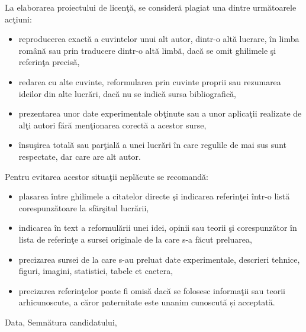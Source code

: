         La elaborarea proiectului de licenţă, se consideră plagiat una dintre următoarele acţiuni: 
        \begin{itemize}
            \setlength\itemsep{-0.5em}
            \item reproducerea exactă a cuvintelor unui alt autor, dintr-o altă lucrare, în limba română sau prin traducere dintr-o altă limbă, dacă se omit ghilimele şi referinţa precisă, 
            \item redarea cu alte cuvinte, reformularea prin cuvinte proprii sau rezumarea ideilor din alte lucrări, dacă nu se indică sursa bibliografică, 
            \item prezentarea unor date experimentale obţinute sau a unor aplicaţii realizate de alţi autori fără menţionarea corectă a acestor surse, 
            \item însuşirea totală sau parţială a unei lucrări în care regulile de mai sus sunt respectate, dar care are alt autor. 
        \end{itemize}
        Pentru evitarea acestor situaţii neplăcute se recomandă:
        \begin{itemize}
            \setlength\itemsep{-0.5em}
            \item plasarea între ghilimele a citatelor directe şi indicarea referinţei într-o listă corespunzătoare la sfărşitul lucrării, 
            \item indicarea în text a reformulării unei idei, opinii sau teorii şi corespunzător în lista de referinţe a sursei originale de la care s-a făcut preluarea, 
            \item precizarea sursei de la care s-au preluat date experimentale, descrieri tehnice, figuri, imagini, statistici, tabele et caetera, 
            \item precizarea referinţelor poate fi omisă dacă se folosesc informaţii sau teorii arhicunoscute, a căror paternitate este unanim cunoscută și acceptată.
        \end{itemize}
        Data,  \hfill Semnătura candidatului, 